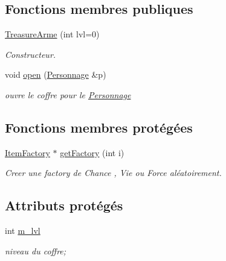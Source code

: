 \subsection*{Fonctions membres publiques}
\begin{DoxyCompactItemize}
\item 
\hyperlink{class_treasure_arme_aca5a0106f253928dcbd134b467d9514b}{Treasure\-Arme} (int lvl=0)
\begin{DoxyCompactList}\small\item\em Constructeur. \end{DoxyCompactList}\item 
void \hyperlink{class_treasure_arme_a67423f71b0680eb22913f014e717cb00}{open} (\hyperlink{class_personnage}{Personnage} \&p)
\begin{DoxyCompactList}\small\item\em ouvre le coffre pour le \hyperlink{class_personnage}{Personnage} \end{DoxyCompactList}\end{DoxyCompactItemize}
\subsection*{Fonctions membres protégées}
\begin{DoxyCompactItemize}
\item 
\hyperlink{class_item_factory}{Item\-Factory} $\ast$ \hyperlink{class_treasure_ab3a8e251ac3ce8524e142e7f93979eb6}{get\-Factory} (int i)
\begin{DoxyCompactList}\small\item\em Creer une factory de Chance , Vie ou Force aléatoirement. \end{DoxyCompactList}\end{DoxyCompactItemize}
\subsection*{Attributs protégés}
\begin{DoxyCompactItemize}
\item 
\hypertarget{class_treasure_a51144d1fb776d1c0612b87d3d8006aa8}{int \hyperlink{class_treasure_a51144d1fb776d1c0612b87d3d8006aa8}{m\-\_\-lvl}}\label{class_treasure_a51144d1fb776d1c0612b87d3d8006aa8}

\begin{DoxyCompactList}\small\item\em niveau du coffre; \end{DoxyCompactList}\end{DoxyCompactItemize}


